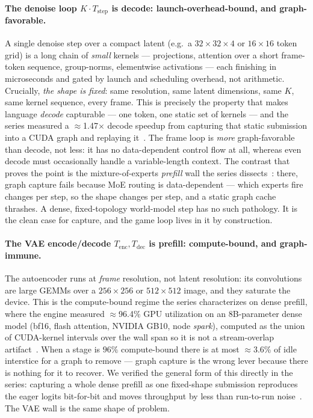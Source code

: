 \documentclass[11pt]{article}
\newcommand{\Tstep}{\ensuremath{T_{\mathrm{step}}}}
\newcommand{\Tenc}{\ensuremath{T_{\mathrm{enc}}}}
\newcommand{\Tdec}{\ensuremath{T_{\mathrm{dec}}}}
\begin{document}
\paragraph{The denoise loop $K\cdot\Tstep$ is decode: launch-overhead-bound, and graph-favorable.} A single
denoise step over a compact latent (e.g.\ a $32{\times}32{\times}4$ or $16{\times}16$ token grid) is a long
chain of \emph{small} kernels --- projections, attention over a short frame-token sequence, group-norms,
elementwise activations --- each finishing in microseconds and gated by launch and scheduling overhead, not
arithmetic. Crucially, \emph{the shape is fixed}: same resolution, same latent dimensions, same $K$, same
kernel sequence, every frame. This is precisely the property that makes language \emph{decode} capturable ---
one token, one static set of kernels --- and the series measured a $\approx$1.47$\times$ decode speedup from
capturing that static submission into a CUDA graph and replaying it~\cite{backend,latency}. The frame loop is
\emph{more} graph-favorable than decode, not less: it has no data-dependent control flow at all, whereas even
decode must occasionally handle a variable-length context. The contrast that proves the point is the
mixture-of-experts \emph{prefill} wall the series dissects~\cite{openproblems}: there, graph capture fails
because MoE routing is data-dependent --- which experts fire changes per step, so the shape changes per step,
and a static graph cache thrashes. A dense, fixed-topology world-model step has no such pathology. It is the
clean case for capture, and the game loop lives in it by construction.

\paragraph{The VAE encode/decode $\Tenc,\Tdec$ is prefill: compute-bound, and graph-immune.} The autoencoder
runs at \emph{frame} resolution, not latent resolution: its convolutions are large GEMMs over a
$256{\times}256$ or $512{\times}512$ image, and they saturate the device. This is the compute-bound regime the
series characterizes on dense prefill, where the engine measured $\approx$96.4\% GPU utilization on an
$8$B-parameter dense model (bf16, flash attention, NVIDIA GB10, node \emph{spark}), computed as the union of
CUDA-kernel intervals over the wall span so it is not a stream-overlap artifact~\cite{openproblems}. When a
stage is $96\%$ compute-bound there is at most $\approx$3.6\% of idle interstice for a graph to remove ---
graph capture is the wrong lever because there is nothing for it to recover. We verified the general form of
this directly in the series: capturing a whole dense prefill as one fixed-shape submission reproduces the
eager logits bit-for-bit and moves throughput by less than run-to-run noise~\cite{openproblems}. The VAE wall
is the same shape of problem.
\end{document}
